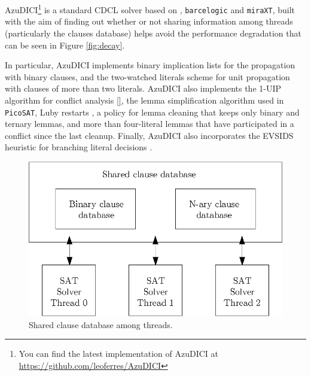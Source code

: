 AzuDICI\footnote{You can find the latest implementation of AzuDICI at
  \url{https://github.com/leoferres/AzuDICI}} is a standard CDCL
solver based on \pling, {\tt barcelogic} and {\tt miraXT}, built with
the aim of finding out whether or not sharing information among
threads (particularly the clauses database) helps avoid the
performance degradation that can be seen in Figure \ref{fig:decay}.

In particular, AzuDICI implements binary implication lists for the
propagation with binary clauses, and the two-watched literals scheme
for unit propagation \cite{} with clauses of more than two
literals. AzuDICI also implements the 1-UIP algorithm for conflict
analysis \ref{}, the lemma simplification algorithm used in {\tt
  PicoSAT}, Luby restarts \cite{}, a policy for lemma cleaning that
keeps only binary and ternary lemmas, and more than four-literal
lemmas that have participated in a conflict since the last
cleanup. Finally, AzuDICI also incorporates the EVSIDS heuristic for
branching literal decisions \cite{}.

\begin{figure}[tp]
  \centering
  \includegraphics[scale=0.7]{AzuDICI_database}
  \caption{Shared clause database among threads.}
  \label{fig:azu database}
\end{figure}

